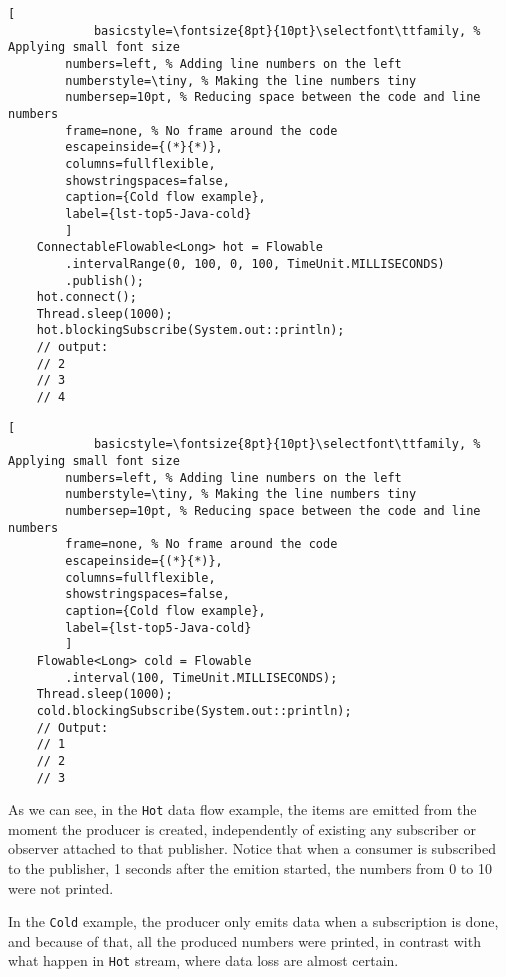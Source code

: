 	\begin{center}
		\begin{minipage}[t]{.49\textwidth}
		\begin{lstlisting}[
			basicstyle=\fontsize{8pt}{10pt}\selectfont\ttfamily, % Applying small font size
        numbers=left, % Adding line numbers on the left
        numberstyle=\tiny, % Making the line numbers tiny
        numbersep=10pt, % Reducing space between the code and line numbers
        frame=none, % No frame around the code
        escapeinside={(*}{*)},
        columns=fullflexible,
        showstringspaces=false,
        caption={Cold flow example},
        label={lst-top5-Java-cold}
		]
	ConnectableFlowable<Long> hot = Flowable
		.intervalRange(0, 100, 0, 100, TimeUnit.MILLISECONDS)
		.publish();
	hot.connect(); 
	Thread.sleep(1000);
	hot.blockingSubscribe(System.out::println);
	// output:
	// 2
	// 3
	// 4
		\end{lstlisting}
		\end{minipage}
		\hfill
		\begin{minipage}[t]{.49\textwidth}
		\begin{lstlisting}[
			basicstyle=\fontsize{8pt}{10pt}\selectfont\ttfamily, % Applying small font size
        numbers=left, % Adding line numbers on the left
        numberstyle=\tiny, % Making the line numbers tiny
        numbersep=10pt, % Reducing space between the code and line numbers
        frame=none, % No frame around the code
        escapeinside={(*}{*)},
        columns=fullflexible,
        showstringspaces=false,
        caption={Cold flow example},
        label={lst-top5-Java-cold}
		]
	Flowable<Long> cold = Flowable
		.interval(100, TimeUnit.MILLISECONDS);
	Thread.sleep(1000);
	cold.blockingSubscribe(System.out::println);
	// Output:
	// 1
	// 2
	// 3
		\end{lstlisting}
		\end{minipage}
	\end{center}
	

	As we can see, in the \texttt{Hot} data flow example, the items are emitted from the moment the producer is created, independently of existing any subscriber or observer attached to that publisher. Notice that when a consumer is subscribed to the publisher, 1 seconds after the emition started, the numbers from 0 to 10 were not printed.
	
	In the \texttt{Cold} example, the producer only emits data when a subscription is done, and because of that, all the produced numbers were printed, in contrast with what happen in \texttt{Hot} stream, where data loss are almost certain. 
	\clearpage
